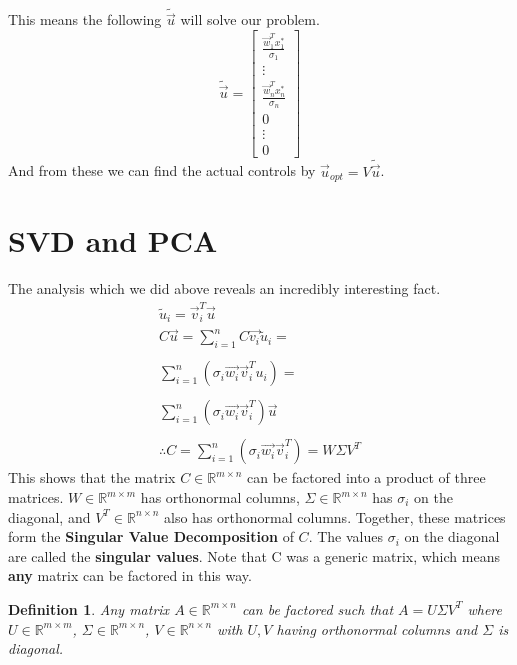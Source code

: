 \documentclass{article}
\newtheorem{definition}{Definition}
\begin{document}
This means the following $\tilde{\vec{u}}$ will solve our problem.
\[
    \tilde{\vec{u}} = \left[
        \begin{array}{c}
            \frac{\vec{w}^T_1x^*_1}{\sigma_1}\\
            \vdots\\
            \frac{\vec{w}^T_nx^*_n}{\sigma_n}\\
            0\\
            \vdots\\
            0
        \end{array}
    \right]
\]
And from these we can find the actual controls by $\vec{u}_{opt}=V\tilde{\vec{u}}$.
\section{SVD and PCA}
The analysis which we did above reveals an incredibly interesting fact.
\[
    \begin{array}{c}
        \tilde{u}_i=\vec{v}_i^T\vec{u}\\
        C\vec{u}=\sum_{i=1}^{n}{C\vec{v_i}\tilde{u}_i}=\\\\
        \sum_{i=1}^{n}{(\sigma_i\vec{w_i}\vec{v}^T_iu_i)}=\\\\
        \sum_{i=1}^{n}{(\sigma_i\vec{w_i}\vec{v}^T_i)} \vec{u}\\\\
        \therefore C = \sum_{i=1}^{n}{(\sigma_i\vec{w_i}\vec{v}^T_i)} = W\Sigma V^T
    \end{array}
\]
This shows that the matrix $C\in \mathbb{R}^{m \times n}$ can be factored into a product of three matrices.
$W\in \mathbb{R}^{m \times m}$ has orthonormal columns, $\Sigma \in \mathbb{R}^{m \times n}$ has $\sigma_i$ on the diagonal, and $V^T \in \mathbb{R}^{n \times n}$ also has orthonormal columns.
Together, these matrices form the \textbf{Singular Value Decomposition} of $C$. The values $\sigma_i$ on the diagonal are called the \textbf{singular values}. Note that C was a generic matrix, which means \textbf{any} matrix can be factored in this way. 
\begin{definition}
    Any matrix $A\in \mathbb{R}^{m\times n}$ can be factored such that $A = U\Sigma V^T$
     where $U\in \mathbb{R}^{m\times m}$, $\Sigma \in \mathbb{R}^{m \times n}$, $V\in \mathbb{R}^{n \times n}$
     with $U,V$ having orthonormal columns and $\Sigma$ is diagonal. 
\end{definition}
\end{document}
